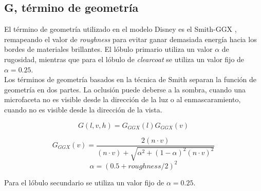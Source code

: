             \subsection*{G, t\'ermino de geometr\'ia}
                El t\'ermino de geometr\'ia utilizado en el modelo Disney \autocite{disney12} es el Smith-GGX \autocite{ggx}, remapeando el valor de \textit{roughness} para evitar
                ganar demasiada energ\'ia hacia los bordes de materiales brillantes. El l\'obulo primario utiliza un valor $\alpha$
                de rugosidad, mientras que para el l\'obulo de \textit{clearcoat} se utiliza un valor fijo de $\alpha = 0.25$.\\

                Los t\'erminos de geometr\'ia basados en la t\'ecnica de Smith \autocite{smith} separan la funci\'on de geometr\'ia en dos partes.
                La oclusi\'on puede deberse a la sombra, cuando una microfaceta no es visible desde la direcci\'on de la luz o al enmascaramiento,
                cuando no es visible desde la direcci\'on de la vista.
    
                $$
                G(l, v, h) = G_{GGX}(l)G_{GGX}(v)
                $$
    
                $$
                G_{GGX}(v) = \frac
                {2 (n \cdot{v})}
                {(n \cdot{v}) + \sqrt{ \alpha^2 + (1 - \alpha)^2 (n \cdot{v})^2 }}
                $$
                \singlespacing
                \begin{equation}
                \alpha = (0.5 + roughness / 2)^2
                \end{equation}
                \singlespacing
    
                Para el l\'obulo secundario se utiliza un valor fijo de $\alpha = 0.25$.\\
    
